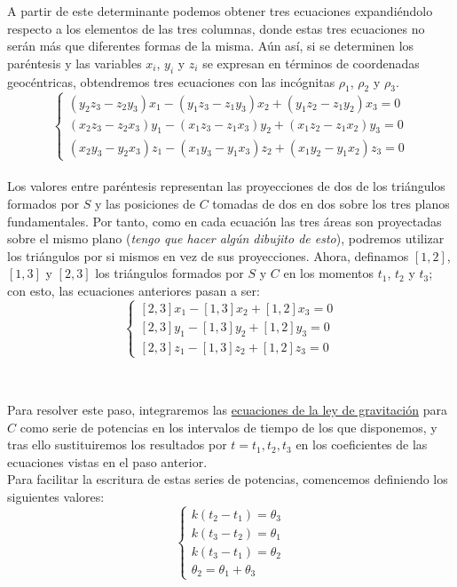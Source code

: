 \documentclass[11pt]{article}
\begin{document}
A partir de este determinante podemos obtener tres ecuaciones expandiéndolo respecto a los elementos de las tres columnas, donde estas tres ecuaciones no serán más que diferentes formas de la misma. Aún así, si se determinen los paréntesis y las variables $x_i$, $y_i$ y $z_i$ se expresan en términos de coordenadas geocéntricas, obtendremos tres ecuaciones con las incógnitas $\rho_1$, $\rho_2$ y $\rho_3$.
\[
\left\{
\begin{array}{l}
	(y_2z_3-z_2y_3)x_1-(y_1z_3-z_1y_3)x_2+(y_1z_2-z_1y_2)x_3=0\\
	(x_2z_3-z_2x_3)y_1-(x_1z_3-z_1x_3)y_2+(x_1z_2-z_1x_2)y_3=0\\
	(x_2y_3-y_2x_3)z_1-(x_1y_3-y_1x_3)z_2+(x_1y_2-y_1x_2)z_3=0
\end{array}
\right.
\]\\

Los valores entre paréntesis representan las proyecciones de dos de los triángulos formados por $S$ y las posiciones de $C$ tomadas de dos en dos sobre los tres planos fundamentales. Por tanto, como en cada ecuación las tres áreas son proyectadas sobre el mismo plano (\textit{tengo que hacer algún dibujito de esto}), podremos utilizar los triángulos por si mismos en vez de sus proyecciones. Ahora, definamos $[1,2]$, $[1,3]$ y $[2,3]$ los triángulos formados por $S$ y $C$ en los momentos $t_1$, $t_2$ y $t_3$; con esto, las ecuaciones anteriores pasan a ser:
\[
\left\{
\begin{array}{l}
	[2,3]x_1-[1,3]x_2+[1,2]x_3=0\\
	{[2,3]}y_1-[1,3]y_2+[1,2]y_3=0\\
	{[2,3]}z_1-[1,3]z_2+[1,2]z_3=0
\end{array}
\right.
\]\\

\subsection{}
Para resolver este paso, integraremos las \hyperref[eq:ley_gracitacion_C]{ecuaciones de la ley de gravitación} para $C$ como serie de potencias en los intervalos de tiempo de los que disponemos, y tras ello sustituiremos los resultados por $t=t_1,t_2,t_3$ en los coeficientes de las ecuaciones vistas en el paso anterior.\\

Para facilitar la escritura de estas series de potencias, comencemos definiendo los siguientes valores:
\[
\left\{
\begin{array}{l}
	k(t_2-t_1)=\theta_3\\
	k(t_3-t_2)=\theta_1\\
	k(t_3-t_1)=\theta_2\\
	\theta_2=\theta_1+\theta_3
\end{array}
\right.
\]
\end{document}

